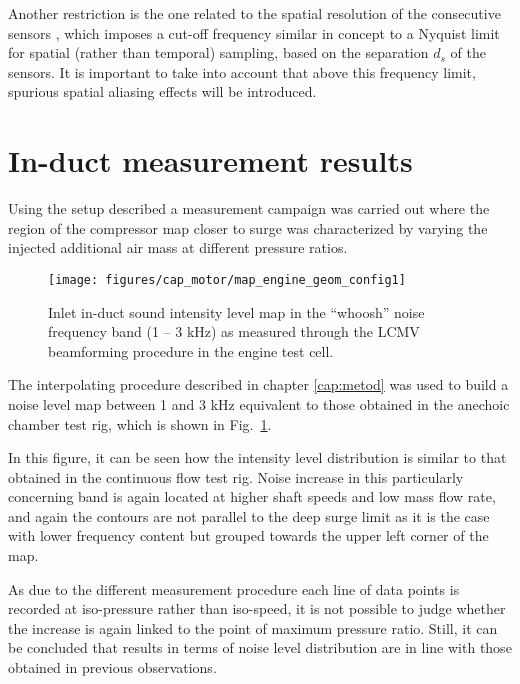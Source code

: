 Another restriction is the one related to the spatial resolution of the consecutive sensors \cite{seybert1988two}, which imposes a cut-off frequency similar in concept to a Nyquist limit for spatial (rather than temporal) sampling, based on the separation $d_s$ of the sensors. It is important to take into account that above this frequency limit, spurious spatial aliasing effects will be introduced.

\section{In-duct measurement results}

Using the setup described a measurement campaign was carried out where the region of the compressor map closer to surge was characterized by varying the injected additional air mass at different pressure ratios.

\begin{figure}[b!]
\centering
\vspace{-5mm}
\texttt{[image: figures/cap\_motor/map\_engine\_geom\_config1]}
\vspace{-5mm}
\caption{Inlet in-duct sound intensity level map in the ``whoosh'' noise frequency band (1 -- 3 kHz) as measured through the LCMV beamforming procedure in the engine test cell.}
\label{fig:mot_map_engine_geom_config1}
\end{figure}

The interpolating procedure described in chapter \ref{cap:metod} was used to build a noise level map between 1 and 3 kHz equivalent to those obtained in the anechoic chamber test rig, which is shown in Fig.~\ref{fig:mot_map_engine_geom_config1}.

In this figure, it can be seen how the intensity level distribution is similar to that obtained in the continuous flow test rig. Noise increase in this particularly concerning band is again located at higher shaft speeds and low mass flow rate, and again the contours are not parallel to the deep surge limit as it is the case with lower frequency content but grouped towards the upper left corner of the map.

As due to the different measurement procedure each line of data points is recorded at iso-pressure rather than iso-speed, it is not possible to judge whether the increase is again linked to the point of maximum pressure ratio. Still, it can be concluded that results in terms of noise level distribution are in line with those obtained in previous observations.

